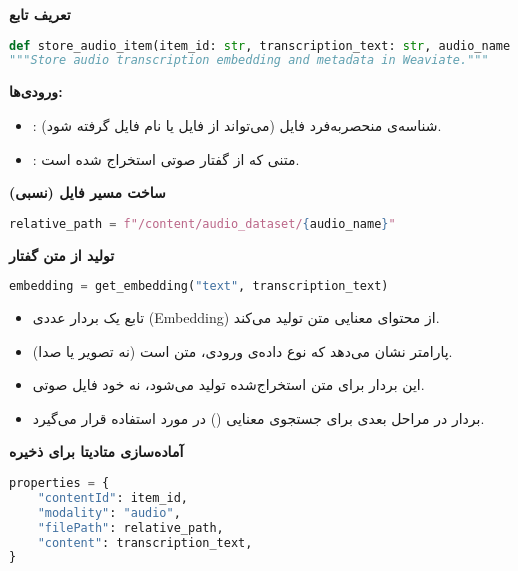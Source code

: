 \documentclass{article}
\begin{document}
\textbf{تعریف تابع}

\begin{latin}
\begin{lstlisting}[language=Python]
def store_audio_item(item_id: str, transcription_text: str, audio_name: str = ""):
"""Store audio transcription embedding and metadata in Weaviate."""
\end{lstlisting}
\end{latin}

\textbf{ورودی‌ها:}  
\begin{itemize}
    \item {}: شناسه‌ی منحصربه‌فرد فایل (می‌تواند از فایل  یا نام فایل گرفته شود).  
    \item {}: متنی که از گفتار صوتی استخراج شده است.  
\end{itemize}

\textbf{ساخت مسیر فایل (نسبی)}

\begin{latin}
\begin{lstlisting}[language=Python]
relative_path = f"/content/audio_dataset/{audio_name}"
\end{lstlisting}
\end{latin}


\textbf{تولید  از متن گفتار}

\begin{latin}
\begin{lstlisting}[language=Python]
embedding = get_embedding("text", transcription_text)
\end{lstlisting}
\end{latin}

\begin{itemize}
    \item تابع  یک بردار عددی (Embedding) از محتوای معنایی متن تولید می‌کند.  
    \item پارامتر  نشان می‌دهد که نوع داده‌ی ورودی، متن است (نه تصویر یا صدا).  
    \item این بردار برای متن استخراج‌شده تولید می‌شود، نه خود فایل صوتی.  
    \item بردار  در مراحل بعدی برای جستجوی معنایی () در  مورد استفاده قرار می‌گیرد.  
\end{itemize}

\textbf{آماده‌سازی متادیتا برای ذخیره}

\begin{latin}
\begin{lstlisting}[language=Python]
properties = {
    "contentId": item_id,
    "modality": "audio",
    "filePath": relative_path,
    "content": transcription_text,
}
\end{lstlisting}
\end{latin}
\end{document}
